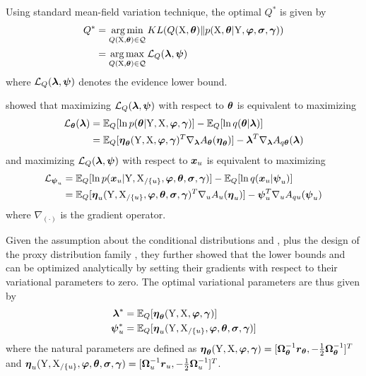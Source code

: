 Using standard mean-field variation technique, the optimal $Q^*$ is given by
\begin{align}
    Q^* 
    & = \operatorname*{arg\,min}_{Q(\mathrm{X},\boldsymbol{\theta})\in\mathcal{Q}}KL(Q(\mathrm{X},\boldsymbol{\theta})\|p(\mathrm{X},\boldsymbol{\theta}\vert\mathrm{Y},\boldsymbol{\varphi},\boldsymbol{\sigma},\boldsymbol{\gamma})) 
    \nonumber
    \\
    & = \operatorname*{arg\,max}_{Q(\mathrm{X},\boldsymbol{\theta})\in\mathcal{Q}}\mathcal{L}_Q(\boldsymbol{\lambda},\boldsymbol{\psi})
\end{align}
where $\mathcal{L}_Q(\boldsymbol{\lambda},\boldsymbol{\psi})$ denotes the evidence lower bound.

\cite{gorbach2017scalable} showed that maximizing $\mathcal{L}_Q(\boldsymbol{\lambda},\boldsymbol{\psi})$ with respect to $\boldsymbol{\theta}$ is equivalent to maximizing
\begin{align}
    \mathcal{L}_{\dymtheta}(\dymlambdavi) 
    & = \mathbb{E}_Q[
            \ln{p(\dymtheta\vert\dymY,\dymX,\dymphi,\dymgamma)}]
        - \mathbb{E}_Q[
            \ln{q(\dymtheta\vert\dymlambdavi)}]
    \nonumber             
    \\
    & = \mathbb{E}_Q[
        \dymetathetacanonical^T\nabla_{\dymlambdavi}\dymAthetacanonical] - \dymlambdavi^T\nabla_{\dymlambdavi}\dymAthetacanonicalQ
    \label{eq-vgmgp-elbo-theta}
\end{align}
and maximizing $\mathcal{L}_Q(\boldsymbol{\lambda},\boldsymbol{\psi})$ with respect to $\boldsymbol{x}_{u}$ is equivalent to maximizing
\begin{align}
    \mathcal{L}_{\dympsiuvi} 
    & = \mathbb{E}_Q[
            \ln{p(\dymxk{u}\vert\dymY,\dymXwithoutk{u},\dymphi,\dymtheta,\dymsigma,\dymgamma)}]
        - \mathbb{E}_Q[
            \ln{q(\dymxk{u}\vert\dympsiuvi)}
        ]
    \nonumber
    \\
    & = \mathbb{E}_Q[
        \dymetaucanonical^T\nabla_{u}\dymAucanonical] -\dympsiuvi^T\nabla_{u}\dymAucanonicalQ
    \label{eq-vgmgp-elbo-xu}
\end{align}
where $\nabla_{(\cdot)}$ is the gradient operator.

Given the assumption about the conditional distributions  and , plus the design of the proxy distribution family , they further showed that the lower bounds  and  can be optimized analytically by setting their gradients  with respect to their variational parameters to zero. 
The optimal variational parameters are thus given by
\begin{align}
    \dymlambdavi^*
    & = \mathbb{E}_Q[\dymetathetacanonical] 
    \label{eq-vgmgp-lambda-vi-optimal}
    \\
    \dympsiuvi^* 
    & = \mathbb{E}_Q[\dymetaucanonical]
    \label{eq-vgmgp-psiu-vi-optimal}
\end{align}
where the natural parameters are defined as $\boldsymbol{\eta}_{\boldsymbol{\theta}}(\mathrm{Y},\mathrm{X},\boldsymbol{\varphi},\boldsymbol{\gamma}) = [\boldsymbol{\Omega}_{\boldsymbol{\theta}}^{-1}\boldsymbol{r}_{\boldsymbol{\theta}}, -\frac{1}{2}\boldsymbol{\Omega}_{\boldsymbol{\theta}}^{-1}]^T$ and $\boldsymbol{\eta}_{u}(\mathrm{Y},\mathrm{X}_{/\{u\}},\boldsymbol{\varphi},\boldsymbol{\theta},\boldsymbol{\sigma},\boldsymbol{\gamma}) = [\boldsymbol{\Omega}_{u}^{-1} \boldsymbol{r}_{u}, -\frac{1}{2}\boldsymbol{\Omega}_{u}^{-1}]^T$.

